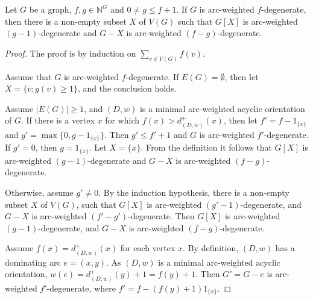 \documentclass[10pt,a4paper]{amsart}
\begin{document}
		\begin{lem}
			\label{lem-1}
			Let $G$ be a graph, $f,g \in \mathbb{N}^G$ and $0 \ne g \le f+1$. If $G$ is arc-weighted  $f$-degenerate, then  there is a non-empty subset $X$ of $V(G)$ such that $G[X]$ is arc-weighted  $(g-1)$-degenerate and $G-X$ is arc-weighted $(f-g)$-degenerate. 
		\end{lem}

		\begin{proof}
	The proof is by induction on $\sum_{v \in V(G)}f(v)$. 

 
 Assume that $G$ is arc-weighted $f$-degenerate. 
 If $E(G)=\emptyset$, then let $X=\{v: g(v)  \ge 1\}$, and the conclusion holds.  
 
  Assume $|E(G)| \ge 1$, and $(D,w)$ is a  minimal arc-weighted   acyclic orientation of $G$. If there is a vertex $x$ for which  
$f(x) > d_{(D,w)}^+(x)$, 
then let $f'=f-1_{\{x\}}$ and $g' = \max\{0, g- 1_{\{x\}}\}$. Then $g' \le f'+1$ and $G$ is arc-weighted  $f'$-degenerate. If $g'=0$, then $g=1_{\{x\}}$.  
  Let $X=\{x\}$. From the definition it follows that $G[X]$ is arc-weighted $(g-1)$-degenerate and $G-X$ is arc-weighted $(f-g)$-degenerate. 

   Otherwise, assume $g' \neq 0$. By the induction hypothesis,  there is a non-empty  subset $X$ of $V(G)$, such that $G[X]$ is arc-weighted   $(g'-1)$-degenerate, and $G-X$ is arc-weighted   $(f'-g')$-degenerate. Then $G[X]$ is arc-weighted  $(g-1)$-degenerate, and $G-X$ is arc-weighted $(f-g)$-degenerate.

Assume $f(x) = d_{(D,w)}^+(x)$ for each vertex $x$. 
By definition, $(D,w)$ has a dominating arc $e=(x,y)$.  As $(D,w)$ is a  minimal arc-weighted   acyclic orientation,  $w(e) = d_{(D,w)}^+(y)+1 =f(y)+1$.
Then $G'=G-e$ is  arc-weighted   $f'$-degenerate, where $f'=f-(f(y)+1)1_{\{x\}}$.
 


\end{proof}
\end{document}
